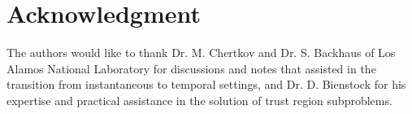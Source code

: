 \documentclass[journal,twoside]{IEEEtran}
\begin{document}


\section*{Acknowledgment}

The authors would like to thank Dr. M. Chertkov and Dr. S. Backhaus of Los Alamos National Laboratory for discussions and notes that assisted in the transition from instantaneous to temporal settings, and Dr. D. Bienstock for his expertise and practical assistance in the solution of trust region subproblems.
\end{document}
